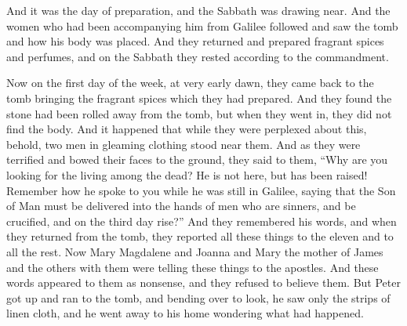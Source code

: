 \begin{biblechapter}
\verse And it was the day of preparation, and the Sabbath was drawing near.
\verse And the women who had been accompanying him from Galilee followed and saw the tomb and how his body was placed.
\verse And they returned and prepared fragrant spices and perfumes, and on the Sabbath they rested according to the commandment.
\end{biblechapter}

\begin{biblechapter} %
 Now on the first day of the week, at very early dawn, they came back to the tomb bringing the fragrant spices which they had prepared.
\verse And they found the stone had been rolled away from the tomb,
\verse but when they went in, they did not find the body.
\verse And it happened that while they were perplexed about this, behold, two men in gleaming clothing stood near them.
\verse And as they were terrified and bowed their faces to the ground, they said to them, “Why are you looking for the living among the dead?
\verse He is not here, but has been raised! Remember how he spoke to you while he was still in Galilee,
\verse saying that the Son of Man must be delivered into the hands of men who are sinners, and be crucified, and on the third day rise?”
\verse And they remembered his words,
\verse and when they returned from the tomb, they reported all these things to the eleven and to all the rest.
\verse Now Mary Magdalene and Joanna and Mary the mother of James and the others with them were telling these things to the apostles.
\verse And these words appeared to them as nonsense, and they refused to believe them.
\verse But Peter got up and ran to the tomb, and bending over to look, he saw only the strips of linen cloth, and he went away to his home wondering what had happened.

\end{biblechapter}
